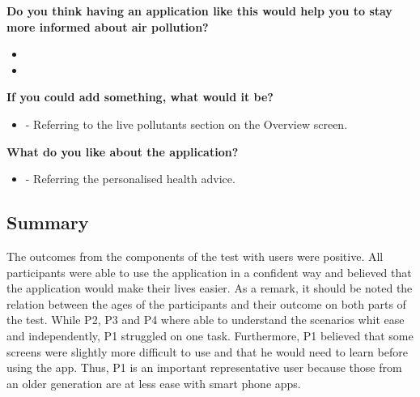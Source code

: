 \bigskip
\textbf{Do you think having an application like this would help you to stay more informed about air pollution?}
\bigskip

\begin{itemize}
	\item {}
    \item {}
\end{itemize}

\bigskip
\textbf{If you could add something, what would it be?}
\bigskip

\begin{itemize}
	\item {} - Referring to the live pollutants section on the Overview screen. 
\end{itemize}

\bigskip
\textbf{What do you like about the application?}
\bigskip

\begin{itemize}
	\item {} - Referring the personalised health advice.
\end{itemize}

\subsection{Summary}
The outcomes from the components of the test with users were positive. All participants were able to use the application in a confident way and believed that the application would make their lives easier. As a remark, it should be noted the relation between the ages of the participants and their outcome on both parts of the test. While P2, P3 and P4 where able to understand the scenarios whit ease and independently, P1 struggled on one task. Furthermore, P1 believed that some screens were slightly more difficult to use and that he would need to learn before using the app. Thus, P1 is an important representative user because those from an older generation are at less ease with smart phone apps.